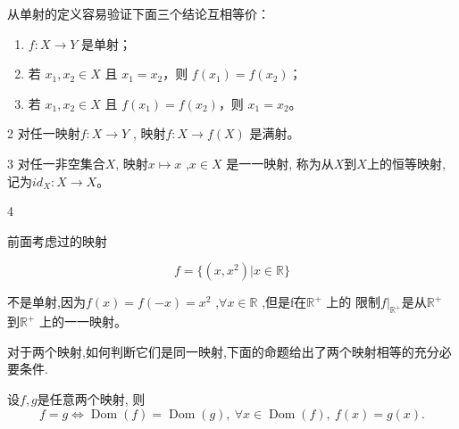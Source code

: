 从单射的定义容易验证下面三个结论互相等价：
\begin{enumerate}[label=\arabic*)]
	\item \(f: X \to Y\) 是单射；
	\item 若 \(x_1, x_2 \in X\) 且 \(x_1 = x_2\)，则 \(f(x_1) = f(x_2)\)；
	\item 若 \(x_1, x_2 \in X\) 且 \(f(x_1) = f(x_2)\)，则 \(x_1 = x_2\)。
\end{enumerate}



\begin{sourceexample}{2}
	对任一映射\(f:X\to Y\) , 映射\(f:X\to f(X)\) 是满射。
\end{sourceexample}

\begin{sourceexample}{3}
	对任一非空集合$X$, 映射\(x \mapsto x\) ,\(x \in X\) 是一一映射, 称为从$X$到$X$上的恒等映射, 记为\(id_X: X \to X\)。
\end{sourceexample}

\begin{sourceexample}{4}

	前面考虑过的映射
	
	\[f = \{(x, x^2) | x \in \mathbb{R}\}\]
	
	不是单射,因为\(f(x) = f(-x) = x^2\) ,\(\forall x \in \mathbb{R}\) ,但是f在\(\mathbb{R}^+\) 上的 限制\(f|_{\mathbb{R}^{+}}\)是从\(\mathbb{R}^+\) 到\(\mathbb{R}^+\) 上的一一映射。

\end{sourceexample}



对于两个映射,如何判断它们是同一映射,下面的命题给出了两个映射相等的充分必要条件.

\begin{myprop*}{}

设$f,g$是任意两个映射, 则
\[
f = g \iff \operatorname{Dom}(f) = \operatorname{Dom}(g), \ \forall x \in \operatorname{Dom}(f), \ f(x) = g(x).
\]

\end{myprop*}



